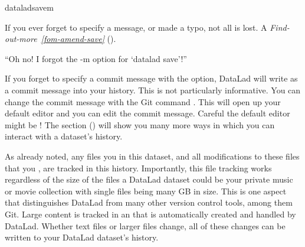 \begin{sphinxVerbatim}[commandchars=\\\{\}]
dataladsave\PYGZhy{}m
\end{sphinxVerbatim}

\sphinxAtStartPar
If you ever forget to specify a message, or made a typo, not all is lost. A
\textit{Find-out-more}~{\findoutmoreiconinline}\textit{\ref{fom-amend-save}} {\hyperref[\detokenize{basics/101-102-populate:fom-amend-save}]{}} ().

\ignorespaces \begin{findoutmore}[label={fom-amend-save}, before title={\thetcbcounter\ }, float, floatplacement=tbp, check odd page=true]{“Oh no! I forgot the -m option for ‘datalad save’!”}
\label{\detokenize{basics/101-102-populate:fom-amend-save}}

\sphinxAtStartPar
If you forget to specify a commit message with the  option, DataLad will write
 as a commit message into your history.
This is not particularly informative.
You can change the  commit message with the Git command
. This will open up your default editor
and you can edit
the commit message. Careful \textendash{} the default editor might be {\hyperref[\detokenize{glossary:term-vim}]{}}!
The section {\hyperref[\detokenize{basics/101-137-history:history}]{}} () will show you many more ways in which you can
interact with a dataset’s history.


\end{findoutmore}

\sphinxAtStartPar
As already noted, any files you  in this dataset, and all modifications
to these files that you , are tracked in this history.
Importantly, this file tracking works
regardless of the size of the files \textendash{} a DataLad dataset could be
your private music or movie collection with single files being many GB in size.
This is one aspect that distinguishes DataLad from many other
version control tools, among them Git.
Large content is tracked in an  that is automatically
created and handled by DataLad. Whether text files or larger files change,
all of these changes can be written to your DataLad dataset’s history.

